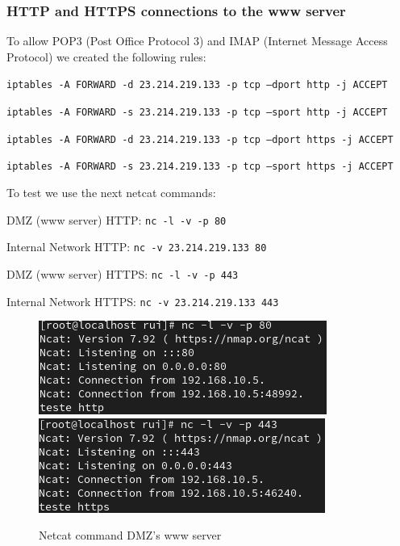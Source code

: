 \documentclass{article}
\begin{document}
\subsubsection{HTTP and HTTPS connections to the www server}

To allow POP3 (Post Office Protocol 3) and IMAP (Internet Message Access Protocol)  we created the following rules:

\texttt{}\par
\texttt{iptables -A FORWARD -d 23.214.219.133 -p tcp --dport http -j ACCEPT}\par
\texttt{iptables -A FORWARD -s 23.214.219.133 -p tcp --sport http -j ACCEPT}\par
\texttt{}\par
\texttt{}\par
\texttt{iptables -A FORWARD -d 23.214.219.133 -p tcp --dport https -j ACCEPT}\par
\texttt{iptables -A FORWARD -s 23.214.219.133 -p tcp --sport https -j ACCEPT}\par
\texttt{}\par


To test we use the next netcat commands:
\texttt{}\par
\texttt{}\par
DMZ (www server) HTTP: \texttt{nc -l -v -p 80} \par
Internal Network HTTP: \texttt{nc -v 23.214.219.133 80} \par
\texttt{}\par
\texttt{}\par
DMZ (www server) HTTPS: \texttt{nc -l -v -p 443} \par
Internal Network HTTPS: \texttt{nc -v 23.214.219.133 443} \par
\texttt{}\par
\begin{figure}[H]
    \centering
    \includegraphics[scale=0.5]{btw/btw_http_dmz.png}
    \includegraphics[scale=0.5]{btw/btw_https_dmz.png}
    \caption{Netcat command DMZ's www server}
    \label{fig:network-arc}
\end{figure}
\end{document}
